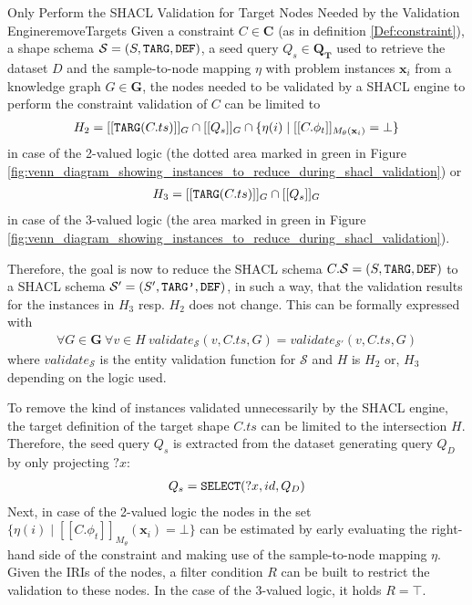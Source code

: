 \begin{Satz}{Only Perform the SHACL Validation for Target Nodes Needed by the Validation Engine}{removeTargets}
    Given a constraint $C \in \mathbf{C}$ (as in definition \ref{Def:constraint}), a shape schema $\mathcal{S} = (S,\texttt{TARG},\texttt{DEF})$, a seed query $Q_s \in \mathbf{Q_T}$ used to retrieve the dataset $D$ and the sample-to-node mapping $\eta$ with problem instances $\mathbf{x}_i$ from a knowledge graph $G \in \mathbf{G}$,  the nodes needed to be validated by a SHACL engine to perform the constraint validation of $C$ can be limited to
    \begin{gather}
        H_2 = [[\texttt{TARG}(C.ts)]]_G \cap [[Q_s]]_G \cap \{\eta(i) \mid [[C.\phi_t]]_{M_\theta(\mathbf{x}_i)} = \bot\} \label{2valuedlogicintersection}
    \end{gather}
    in case of the 2-valued logic (the dotted area marked in green in Figure \ref{fig:venn_diagram_showing_instances_to_reduce_during_shacl_validation}) or 
    \begin{gather}
    H_3 = [[\texttt{TARG}(C.ts)]]_G \cap [[Q_s]]_G \label{3valuedlogicintersection}
    \end{gather} 
    in case of the 3-valued logic (the area marked in green in Figure \ref{fig:venn_diagram_showing_instances_to_reduce_during_shacl_validation}).     
\end{Satz}

Therefore, the goal is now to reduce the SHACL schema $C.\mathcal{S} = (S,\texttt{TARG}, \texttt{DEF})$ to a SHACL schema $\mathcal{S}' = (S',\texttt{TARG'}, \texttt{DEF})$, in such a way, that the validation results for the instances in $H_3$ resp. $H_2$ does not change. This can be formally expressed with
\begin{gather}
\forall G \in \mathbf{G} ~ \forall v \in H ~ \textit{validate}_\mathcal{S}(v,C.ts,G) = \textit{validate}_{\mathcal{S}'}(v,C.ts,G) \label{consistency_shape_shema}
\end{gather}
where $\textit{validate}_\mathcal{S}$ is the entity validation function for $\mathcal{S}$ and $H$ is $H_2$ or, $H_3$ depending on the logic used.

To remove the kind of instances validated unnecessarily by the SHACL engine, the target definition of the target shape $C.ts$ can be limited to the intersection $H$. Therefore, the seed query $Q_s$ is extracted from the dataset generating query $Q_D$ by only projecting $?x$:
\begin{gather}
    Q_s = \texttt{SELECT}(?x,id, Q_D) \label{seed_query_from_dataset_generating_query}
\end{gather}
Next, in case of the 2-valued logic the nodes in the set $\{\eta(i) \mid [[C.\phi_t]]_{M_\theta}(\mathbf{x}_i) = \bot\}$ can be estimated by early evaluating the right-hand side of the constraint and making use of the sample-to-node mapping $\eta$. Given the IRIs of the nodes, a filter condition $R$ can be built to restrict the validation to these nodes. In the case of the 3-valued logic, it holds $R = \top$.

